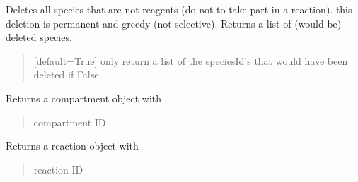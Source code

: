 \documentclass[letterpaper,12pt,english]{sphinxmanual}
\begin{document}
\begin{fulllineitems}
\begin{fulllineitems}
\label{\detokenize{api/core:cbmpy.CBModel.Model.deleteNonReactingSpecies}}
\pysigstartsignatures
\pysiglinewithargsret
{}
{}
{}
\pysigstopsignatures
\sphinxAtStartPar
Deletes all species that are not reagents (do not to take part in a reaction).  this deletion is permanent and greedy (not selective). Returns a list of (would be) deleted species.
\begin{quote}\begin{description}
\sphinxAtStartPar
{} \textendash{} {[}default=True{]} only return a list of the speciesId’s that would have been deleted if False

\end{description}\end{quote}

\end{fulllineitems}


\begin{fulllineitems}
\label{\detokenize{api/core:cbmpy.CBModel.Model.getCompartment}}
\pysigstartsignatures
\pysiglinewithargsret
{}
{}
{}
\pysigstopsignatures
\sphinxAtStartPar
Returns a compartment object with 
\begin{quote}\begin{description}
\sphinxAtStartPar
{} \textendash{} compartment ID

\end{description}\end{quote}

\end{fulllineitems}


\begin{fulllineitems}
\label{\detokenize{api/core:cbmpy.CBModel.Model.getReaction}}
\pysigstartsignatures
\pysiglinewithargsret
{}
{}
{}
\pysigstopsignatures
\sphinxAtStartPar
Returns a reaction object with 
\begin{quote}\begin{description}
\sphinxAtStartPar
{} \textendash{} reaction ID


\end{description}
\end{quote}
\end{fulllineitems}
\end{fulllineitems}
\end{document}
